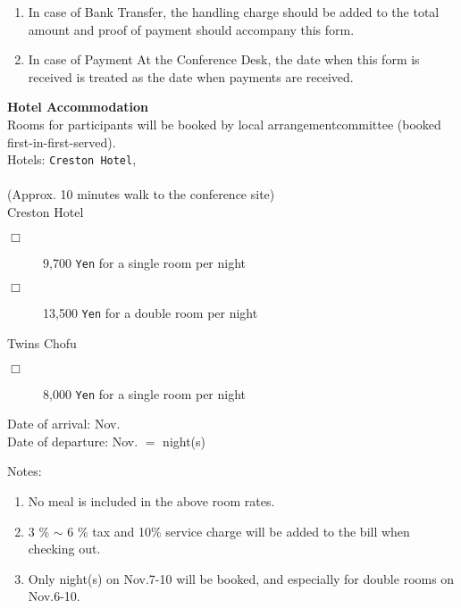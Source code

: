\begin{small}
{\begin{enumerate}
payments.)
\item In case of Bank Transfer, the handling charge  
should be added to the total amount and proof of payment should accompany this form.
\item In case of Payment At the Conference Desk, the date when this form is received
is treated as the date when payments are received.
\end{enumerate}
}
\vspace{3mm}
\noindent
{\normalsize {\bf Hotel Accommodation}}\\
\noindent
Rooms for participants will be booked by local arrangement\linebreak[4]
committee (booked first-in-first-served).\vspace{2.0mm}\\
Hotels: \hspace{3mm} {\tt Creston Hotel},\\
\hspace*{15.8mm}{\tt Hotel Twins Chofu}\\
\hspace*{14.0mm}(Approx. 10 minutes walk to the conference site)\vspace{2.0mm}\\
Creston Hotel
\begin{description}
\item [$\Box$] 9,700 {\tt Yen} for a single room per night
\item [$\Box$] 13,500 {\tt Yen} for a double room per night
\end{description}
Twins Chofu
\begin{description}
\item [$\Box$] 8,000 {\tt Yen} for a single room per night
\end{description}
Date of arrival: \hspace{3mm} Nov. \underline{\hspace{10mm}} \hspace{5mm}\\
Date of departure: Nov. \underline{\hspace{10mm}} $=$ \underline{\hspace{10mm}} night(s)\\
\noindent
{\small
Notes: 
\begin{enumerate}
\item No meal is included in the above room rates.
\item 3 \% $\sim$ 6 \% tax and 10\% service charge will be added to
the bill when checking out.
\item Only night(s) on Nov.7-10 will be booked, and especially for double rooms on Nov.6-10.

\end{enumerate}}
\end{small}

